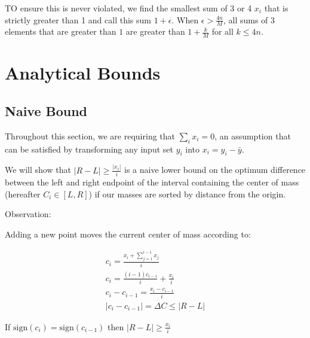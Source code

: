 TO ensure this is never violated, we find the smallest sum of 3 or 4 $x_i$ that is strictly greater than 1 and call this sum $1+\epsilon$.  When $\epsilon > \frac{4n}{M}$, all sums of 3 elements that are greater than $1$ are greater than $1 + \frac{k}{M}$ for all $k\leq 4n$.  

\section{Analytical Bounds}

\subsection{Naive Bound}

Throughout this section, we are requiring that $ \sum_i x_i = 0 $, an assumption that can be satisfied by transforming any input set $ y_i $ into $ x_i = y_i - \bar{y}$. 

We will show that $|R-L| \geq \frac{|x_i|}{i} $ is a naive lower bound on the optimum difference between the left and right endpoint of the interval containing the center of mass (hereafter $ C_i \in [ L, R ] $) if our masses are sorted by distance from the origin. 

Observation:

Adding a new point moves the current center of mass according to:

\begin{eqnarray*}
c_i = \frac{ x_i + \sum_{j=1}^{i-1} x_j }{ i } \\ 
c_i = \frac{ (i-1) c_{i-1}}{i} + \frac{x_i }{ i }  \\
c_i - c_{i-1} = \frac{x_i - c_{i - 1} }{ i } \\
|c_i - c_{i-1}| = \Delta C \leq |R - L|
\end{eqnarray*}

\begin{lem} \label{lem:matchSignNaive}
If $\textrm{sign}(c_i) = \textrm{sign}(c_{i-1})$ then $|R - L| \geq \frac{x_i}{i}$
\end{lem}

